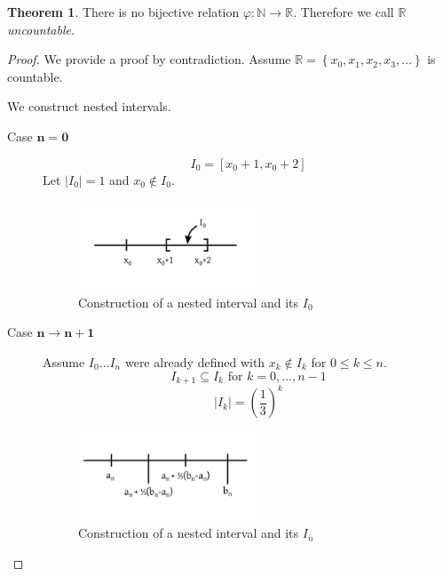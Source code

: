 \documentclass[a4paper,landscape,twocolumn]{article}
\theoremstyle{definition}
\newtheorem{theorem}{Theorem}
\newcommand\set[1]{\left\{#1\right\}}
\newcommand\abs[1]{\left|#1\right|}
\begin{document}
\begin{theorem}
  There is no bijective relation $\varphi: \mathbb N \to \mathbb R$.
  Therefore we call $\mathbb R$ \emph{uncountable}.
\end{theorem}

\begin{proof}
  We provide a proof by contradiction.
  Assume $\mathbb R = \set{x_0, x_1, x_2, x_3, \ldots}$ is countable.

  We construct nested intervals.
  \begin{description}
    \item[Case $\mathbf{n = 0}$]
      \[ I_0 = \left[x_0 + 1, x_0 + 2\right] \]
      Let $\abs{I_0} = 1$ and $x_0 \not\in I_0$.

      \begin{figure}[!t]
        \begin{center}
          \includegraphics[width=200px]{img/interval_I0.pdf}
          \caption{Construction of a nested interval and its $I_0$}
        \end{center}
      \end{figure}

    \item[Case $\mathbf{n \to n + 1}$]
      Assume $I_{0} \dots I_n$ were already defined with $x_k \notin I_k$ for $0 \leq k \leq n$.
      \[ I_{k+1} \subseteq I_k \text{ for } k = 0, \dots, n-1 \]
      \[ \abs{I_k} = \left(\frac13\right)^k \]

      \begin{figure}[!t]
        \begin{center}
          \includegraphics[width=200px]{img/interval_In.pdf}
          \caption{Construction of a nested interval and its $I_n$}
        \end{center}
      \end{figure}


\end{description}
\end{proof}
\end{document}
